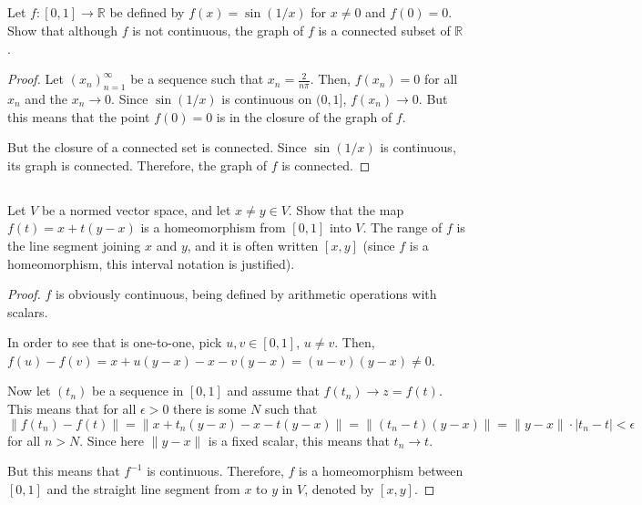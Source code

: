
\subsection{} Let $f: [ 0, 1] \rightarrow \mathbb{R}$ be defined by $f(x) = \sin(1/x)$ for $x \neq 0$ and $f(0) = 0$. Show that although $f$ is not continuous, the graph of $f$ is a connected subset of $\mathbb{R}$.

\begin{proof}
Let $(x_n)_{n=1}^\infty$ be a sequence such that $x_n = \frac{2}{n\pi}$. Then, $f(x_n) = 0$ for all $x_n$ and the $x_n \rightarrow 0$. Since $\sin(1/x)$ is continuous on $(0,1]$, $f(x_n) \rightarrow 0$. But this means that the point $f(0)=0$ is in the closure of the graph of $f$.

But the closure of a connected set is connected. Since $\sin(1/x)$ is continuous, its graph is connected. Therefore, the graph of $f$ is connected.

\end{proof}

\subsection{} Let $V$ be a normed vector space, and let $x \neq y \in V$. Show that the map $f(t) = x + t(y-x)$ is a  homeomorphism from $[0, 1]$ into $V$. The range of $f$ is the line segment joining $x$ and $y$, and it is often written $[x, y]$ (since $f$ is a homeomorphism, this interval notation is justified).

\begin{proof}
$f$ is obviously continuous, being defined by arithmetic operations with scalars.

In order to see that is one-to-one, pick $u,v \in [0,1]$, $u \neq v$. Then, $f(u) - f(v) = x + u(y-x) - x - v(y-x) = (u-v)(y-x) \neq 0$. 

Now let $(t_n)$ be a sequence in $[0,1]$ and assume that $f(t_n) \rightarrow z = f(t)$. This means that for all $\epsilon > 0$ there is some $N$ such that $\|f(t_n) - f(t)\| = \|x + t_n(y-x) - x - t(y-x)\| = \|(t_n-t)(y-x)\| = \|y-x\|\cdot |t_n-t| < \epsilon$ for all $n > N$. Since here $\|y-x\|$ is a fixed scalar, this means that $t_n \rightarrow t$.

But this means that $f^{-1}$ is continuous. Therefore, $f$ is a homeomorphism between $[0,1]$ and the straight line segment from $x$ to $y$ in $V$, denoted by $[x,y]$.

\end{proof}

